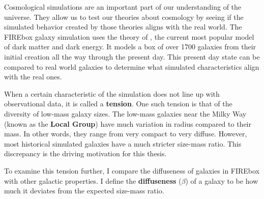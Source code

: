 
Cosmological simulations are an important part of our understanding of the universe. They allow us to test our theories about cosmology by seeing if the simulated behavior created by those theories aligns with the real world. The FIREbox galaxy simulation uses the theory of \textbf{\lcdm}, the current most popular model of dark matter and dark energy. It models a box of over 1700 galaxies from their initial creation all the way through the present day. This present day state can be compared to real world galaxies to determine what simulated characteristics align with the real ones.

When a certain characteristic of the simulation does not line up with observational data, it is called a \textbf{tension}. One such tension is that of the diversity of low-mass galaxy sizes. The low-mass galaxies near the Milky Way (known as the \textbf{Local Group}) have much variation in radius compared to their mass. In other words, they range from very compact to very diffuse. However, most historical simulated galaxies have a much stricter size-mass ratio. This discrepancy is the driving motivation for this thesis.

To examine this tension further, I compare the diffuseness of galaxies in FIREbox with other galactic properties. I define the \textbf{diffuseness} ($\beta$) of a galaxy to be how much it deviates from the expected size-mass ratio. 